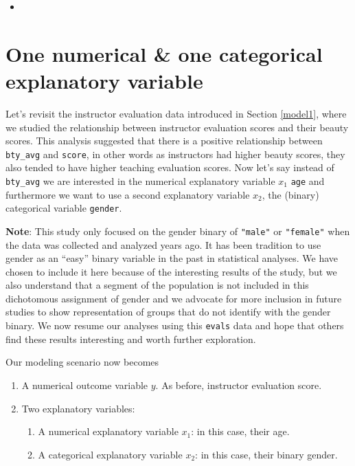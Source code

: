 \documentclass[12pt,]{krantz}
\providecommand{\tightlist}{%
  \setlength{\itemsep}{0pt}\setlength{\parskip}{0pt}}
\newenvironment{rmdblock}[1]
  {\begin{shaded*}
  \begin{itemize}
  \renewcommand{\labelitemi}{
    \raisebox{-.7\height}[0pt][0pt]{
    }
  }
  \item
  }
  {
  \end{itemize}
  \end{shaded*}
  }
\newenvironment{learncheck}
  {\begin{rmdblock}{warning}}
  {\end{rmdblock}}
\theoremstyle{definition}
\theoremstyle{definition}
\theoremstyle{definition}
\theoremstyle{remark}
\begin{document}
\begin{learncheck}

\end{learncheck}

\section{One numerical \& one categorical explanatory
variable}\label{model4}

Let's revisit the instructor evaluation data introduced in Section
\ref{model1}, where we studied the relationship between instructor
evaluation scores and their beauty scores. This analysis suggested that
there is a positive relationship between \texttt{bty\_avg} and
\texttt{score}, in other words as instructors had higher beauty scores,
they also tended to have higher teaching evaluation scores. Now let's
say instead of \texttt{bty\_avg} we are interested in the numerical
explanatory variable \(x_1\) \texttt{age} and furthermore we want to use
a second explanatory variable \(x_2\), the (binary) categorical variable
\texttt{gender}.

\textbf{Note}: This study only focused on the gender binary of
\texttt{"male"} or \texttt{"female"} when the data was collected and
analyzed years ago. It has been tradition to use gender as an ``easy''
binary variable in the past in statistical analyses. We have chosen to
include it here because of the interesting results of the study, but we
also understand that a segment of the population is not included in this
dichotomous assignment of gender and we advocate for more inclusion in
future studies to show representation of groups that do not identify
with the gender binary. We now resume our analyses using this
\texttt{evals} data and hope that others find these results interesting
and worth further exploration.

Our modeling scenario now becomes

\begin{enumerate}
\def\labelenumi{\arabic{enumi}.}
\tightlist
\item
  A numerical outcome variable \(y\). As before, instructor evaluation
  score.
\item
  Two explanatory variables:

  \begin{enumerate}
  \def\labelenumii{\arabic{enumii}.}
  \tightlist
  \item
    A numerical explanatory variable \(x_1\): in this case, their age.
  \item
    A categorical explanatory variable \(x_2\): in this case, their
    binary gender.
  \end{enumerate}
\end{enumerate}
\end{document}

